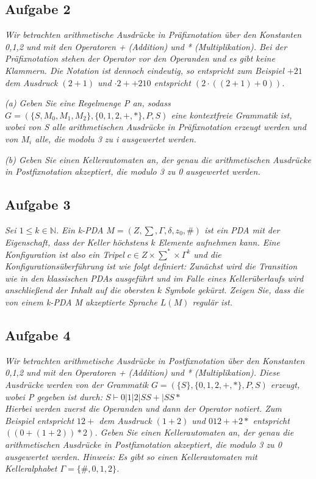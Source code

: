\documentclass[a4paper]{article}
\begin{document}
\subsection{Aufgabe 2}
\textit{Wir betrachten arithmetische Ausdrücke in Präfixnotation über den Konstanten 0,1,2 und mit den Operatoren + (Addition) und * (Multiplikation). Bei der Präfixnotation stehen der Operator vor den Operanden und es gibt keine Klammern. Die Notation ist dennoch eindeutig, so entspricht zum Beispiel $+21$ dem Ausdruck $(2 + 1)$ und $·2++210$ entspricht $(2 · ((2 + 1) + 0))$.}

\textit{(a) Geben Sie eine Regelmenge P an, sodass $G = (\{S, M_0 , M_1 , M_2 \}, \{0, 1, 2, +, *\}, P, S)$ eine kontextfreie Grammatik ist, wobei von S alle arithmetischen Ausdrücke in Präfixnotation erzeugt werden und von $M_i$ alle, die modolu 3 zu i ausgewertet werden.}

\textit{(b) Geben Sie einen Kellerautomaten an, der genau die arithmetischen Ausdrücke in Postfixnotation akzeptiert, die modulo 3 zu 0 ausgewertet werden.}


\subsection{Aufgabe 3}
\textit{Sei $1\leq k \in\mathbb{N}$. Ein k-PDA $M = (Z ,\sum, \Gamma, \delta, z_0 , \#)$ ist ein PDA mit der Eigenschaft, dass der Keller höchstens $k$ Elemente aufnehmen kann. Eine Konfiguration ist also ein Tripel $c\in Z \times\sum^*\times\Gamma^k$ und die Konfigurationsüberführung ist wie folgt definiert: Zunächst wird die Transition wie in den klassischen PDAs ausgeführt und im Falle eines Kellerüberlaufs wird anschließend der Inhalt auf die obersten $k$ Symbole gekürzt. Zeigen Sie, dass die von einem k-PDA M akzeptierte Sprache $L(M)$ regulär ist.}

\subsection{Aufgabe 4}
\textit{Wir betrachten arithmetische Ausdrücke in Postfixnotation über den Konstanten 0,1,2 und mit den Operatoren + (Addition) und * (Multiplikation). Diese Ausdrücke werden von der Grammatik $G = (\{S\}, \{0, 1, 2, +, *\}, P, S)$ erzeugt, wobei P gegeben ist durch: $S \vdash 0 | 1 | 2 | SS+ | SS*$\\
Hierbei werden zuerst die Operanden und dann der Operator notiert. Zum Beispiel entspricht $12+$ dem Ausdruck $(1+2)$ und $012++2*$ entspricht $((0+(1+2))*2)$. Geben Sie einen Kellerautomaten an, der genau die arithmetischen Ausdrücke in Postfixnotation akzeptiert, die modulo 3 zu 0 ausgewertet werden.
Hinweis: Es gibt so einen Kellerautomaten mit Kelleralphabet $\Gamma = \{\#, 0, 1, 2\}$.}
\end{document}
